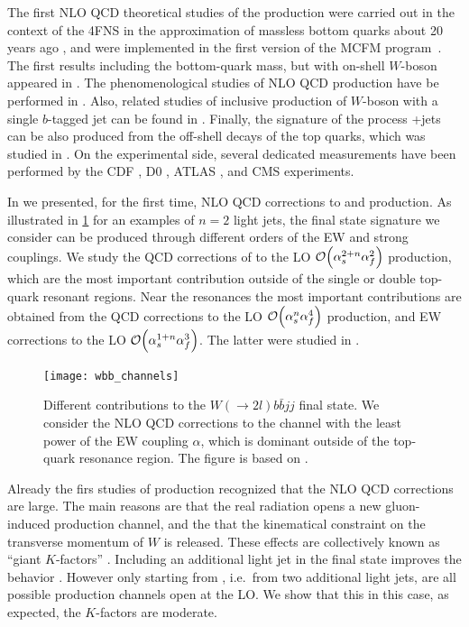 The first NLO QCD theoretical studies of the \Wbb{} production were carried out in 
the context of the 4FNS in the approximation of massless bottom quarks about 20 years ago \cite{Bern:1997sc,Ellis:1998fv},
and were implemented in the first version of the MCFM program~\cite{mcfm7}.
The first results including the bottom-quark mass, but with on-shell $W$-boson 
appeared in \cite{FebresCordero:2006sj,Cordero:2009kv,Badger:2010mg,Oleari:2011ey}.
The phenomenological studies of NLO QCD \Wbbnj[1]{} production have be performed in \cite{Luisoni:2015mpa}.
Also, related studies of inclusive production of $W$-boson with a single $b$-tagged jet
can be found in \cite{Campbell:2006cu,Campbell:2008hh,Caola:2011pz}.
Finally, the signature of the process \Wbb{}+jets can be also produced from
the off-shell decays of the top quarks, which was studied in \cite{Denner:2017kzu}.
On the experimental side, several dedicated measurements
have been performed by the CDF \cite{Aaltonen:2009qi}, D0 \cite{D0:2012qt}, ATLAS \cite{Aad:2013vka}, and CMS \cite{Chatrchyan:2013uza,CMS:2016bb}
experiments.

In \cite{Anger:2017glm} we presented, for the first time, NLO QCD corrections to \Wbbnj[2]{} and
\Wbbnj[3]{} production. As illustrated in \cref{fig:wbb_channels} for an examples of $n=2$ light jets,
the final state signature we consider can be produced through different orders of the EW and strong couplings.
We study the QCD corrections of to the LO $\order{\alps^{2+n}\alpf^2}$ production,
which are the most important contribution outside of the single or double top-quark resonant regions.
Near the resonances the most important contributions are obtained from the QCD corrections to the LO $\order{\alps^{n}\alpf^4}$ production,
and EW corrections to the LO $\order{\alps^{1+n}\alpf^3}$. The latter were studied in \cite{Denner:2017kzu}.

\begin{figure}[t]
  \centering
  \texttt{[image: wbb\_channels]}
  \caption{
    Different contributions to the $W(\to 2l)b\bar{b}jj$ final state.
    We consider the NLO QCD corrections to the channel with the least power of the EW coupling $\alpha$, which
    is dominant outside of the top-quark resonance region.
    The figure is based on \cite{Denner:2017kzu}.
  }
  \label{fig:wbb_channels}
\end{figure}


Already the firs studies of \Wbb{} production
recognized \cite{Ellis:1998fv,FebresCordero:2006sj,Cordero:2009kv} that the NLO QCD corrections are large. 
The main reasons are that the real radiation opens a new
gluon-induced production channel, and the that
the kinematical constraint on the transverse momentum of  $W$ is released.
These effects are collectively known as ``giant $K$-factors'' \cite{Rubin:2010xp}. 
Including an additional light jet in the final state improves the  behavior \cite{Luisoni:2015mpa}.
However only starting from \Wbbnj[2]{}, i.e.\ from two additional light jets, are all possible production
channels open at the LO.  We show that this in this case, as expected, the $K$-factors are moderate.



